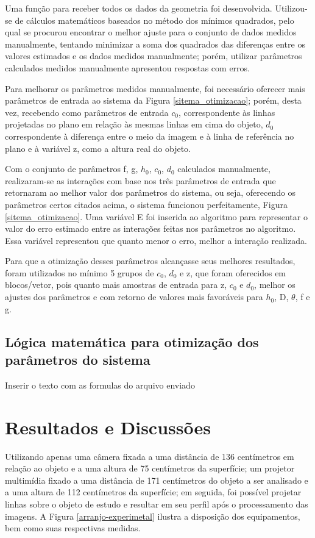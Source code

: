\documentclass[a4paper, 12pt]{article}
\begin{document}
Uma função para receber todos os dados da geometria foi desenvolvida. Utilizou-se de cálculos matemáticos baseados no método dos mínimos quadrados, pelo qual se procurou encontrar o melhor ajuste para o conjunto de dados medidos manualmente, tentando minimizar a soma dos quadrados das diferenças entre os valores estimados e os dados medidos manualmente; porém, utilizar parâmetros calculados medidos manualmente apresentou respostas com erros.

Para melhorar os parâmetros medidos manualmente, foi necessário oferecer mais parâmetros de entrada ao sistema da Figura \ref{sitema_otimizacao}; porém, desta vez, recebendo como parâmetros de entrada $c_0$, correspondente às linhas projetadas no plano em relação às mesmas linhas em cima do objeto, $d_0$ correspondente à diferença entre o meio da imagem e à linha de referência no plano e à variável z, como a altura real do objeto.

Com o conjunto de parâmetros f, g, $h_0$, $c_0$, $d_0$ calculados manualmente, realizaram-se as interações com base nos três parâmetros de entrada que retornaram ao melhor valor dos parâmetros do sistema, ou seja, oferecendo os parâmetros certos citados acima, o sistema funcionou perfeitamente, Figura \ref{sitema_otimizacao}. Uma variável E foi inserida ao algoritmo para representar o valor do erro estimado entre as interações feitas nos parâmetros no algoritmo. Essa variável representou que quanto menor o erro, melhor a interação realizada.

Para que a otimização desses parâmetros alcançasse seus melhores resultados, foram utilizados no mínimo 5 grupos de $c_0$, $d_0$ e z, que foram oferecidos em blocos/vetor, pois quanto mais amostras de entrada para z, $c_0$ e $d_0$, melhor os ajustes dos parâmetros e com retorno de valores mais favoráveis para $h_0$, D, $\theta$, f e g. 

\subsection{Lógica matemática para otimização dos parâmetros do sistema}

Inserir o texto com as formulas do arquivo enviado


\section{Resultados e Discussões}

Utilizando apenas uma câmera fixada a uma distância de 136 centímetros em relação ao objeto e a uma altura de 75 centímetros da superfície; um projetor multimídia fixado a uma distância de 171 centímetros do objeto a ser analisado e a uma altura de 112 centímetros da superfície; em seguida, foi possível projetar linhas sobre o objeto de estudo e resultar em seu perfil após o processamento das imagens. A Figura \ref{arranjo-experimetal} ilustra a disposição dos equipamentos, bem como suas respectivas medidas.
\end{document}
